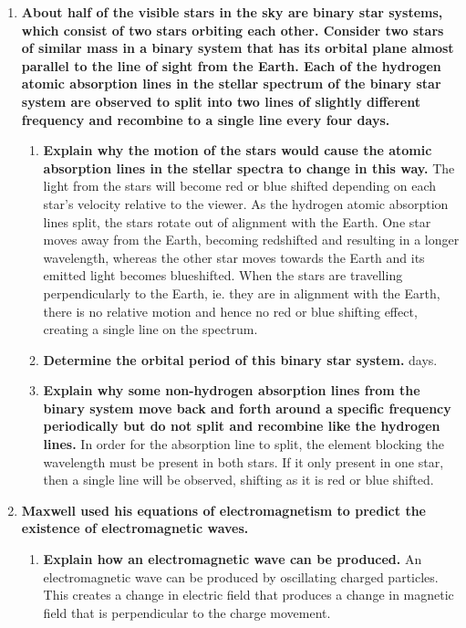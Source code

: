 \documentclass{report}
\begin{document}
\begin{enumerate}
			\item \textbf{About half of the visible stars in the sky are binary star systems, which consist of two stars orbiting each other. Consider two stars of similar mass in a binary system that has its orbital plane almost parallel to the line of sight from the Earth. Each of the hydrogen atomic absorption lines in the stellar spectrum of the binary star system are observed to split into two lines of slightly different frequency and recombine to a single line every four days.}

				\begin{enumerate}
					\item \textbf{Explain why the motion of the stars would cause the atomic absorption lines in the stellar spectra to change in this way.}
						\subitem The light from the stars will become red or blue shifted depending on each star's velocity relative to the viewer. As the hydrogen atomic absorption lines split, the stars rotate out of alignment with the Earth. One star moves away from the Earth, becoming redshifted and resulting in a longer wavelength, whereas the other star moves towards the Earth and its emitted light becomes blueshifted. When the stars are travelling perpendicularly to the Earth, ie. they are in alignment with the Earth, there is no relative motion and hence no red or blue shifting effect, creating a single line on the spectrum.

					\item \textbf{Determine the orbital period of this binary star system.}
						 days.

					\item \textbf{Explain why some non-hydrogen absorption lines from the binary system move back and forth around a specific frequency periodically but do not split and recombine like the hydrogen lines.}
						\subitem In order for the absorption line to split, the element blocking the wavelength must be present in both stars. If it only present in one star, then a single line will be observed, shifting as it is red or blue shifted.
				\end{enumerate}

			\item \textbf{Maxwell used his equations of electromagnetism to predict the existence of electromagnetic waves.}

				\begin{enumerate}
					\item \textbf{Explain how an electromagnetic wave can be produced.}
						\subitem An electromagnetic wave can be produced by oscillating charged particles. This creates a change in electric field that produces a change in magnetic field that is perpendicular to the charge movement.


\end{enumerate}
\end{enumerate}
\end{document}
